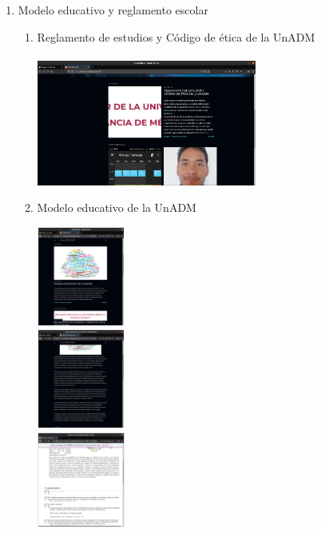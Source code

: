 \documentclass[12pt]{article}
\begin{document}
\begin{enumerate}[{\bf Sesi\'on} 1{.}]
		\item {Modelo educativo y reglamento escolar}
			\begin{enumerate}[{\bf Actividad} 1{.}]
				
				\item {Reglamento de estudios y Código de ética de la UnADM}
					\\\\\includegraphics[width=0.6\textwidth] {CIVUL-U1-S2-A1}
						
				\item {Modelo educativo de la UnADM}
					\begin{multicols}{3}			
						\includegraphics[width=0.24\textwidth] {CIVUL-U1-S2-A2-1}\\
						\includegraphics[width=0.24\textwidth] {CIVUL-U1-S2-A2-2}\\
						\includegraphics[width=0.24\textwidth] {CIVUL-U1-S2-A2-3}
					\end{multicols}
					

\end{enumerate}
\end{enumerate}
\end{document}
